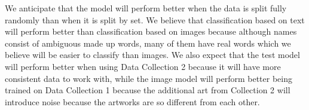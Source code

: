 \documentclass{article}
\begin{document}
We anticipate that the model will perform better
when the data is split fully randomly
than when it is split by set.
We believe that classification based on text
will perform better than classification based on
images because although names consist of ambiguous
made up words, many of them have real words which
we believe will be easier to classify than images.
We also expect that the test model will perform better
when using Data Collection 2 because it will have more
consistent data to work with, while the image model
will perform better being trained on Data Collection 1
because the additional art from Collection 2 will
introduce noise because the artworks are so different
from each other.


{}

\end{document}
